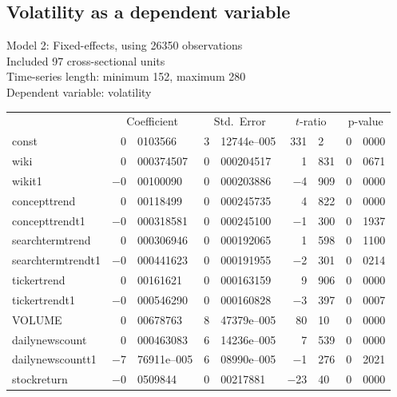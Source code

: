 \subsection{Volatility as a dependent variable}
\begin{center}

Model 2: Fixed-effects, using 26350 observations\\
Included 97 cross-sectional units\\
Time-series length: minimum 152, maximum 280\\
Dependent variable: volatility\\

\vspace{1em}

\begin{tabular}{lr@{,}lr@{,}lr@{,}lr@{,}l}
  &
 \multicolumn{2}{c}{Coefficient} &
  \multicolumn{2}{c}{Std.\ Error} &
   \multicolumn{2}{c}{$t$-ratio} &
    \multicolumn{2}{c}{p-value} \\[1ex]
const &
  0&0103566 &
    3&12744\textrm{e--005} &
      331&2 &
        0&0000 \\
wiki &
  0&000374507 &
    0&000204517 &
      1&831 &
        0&0671 \\
wikit1 &
  $-$0&00100090 &
    0&000203886 &
      $-$4&909 &
        0&0000 \\
concepttrend &
  0&00118499 &
    0&000245735 &
      4&822 &
        0&0000 \\
concepttrendt1 &
  $-$0&000318581 &
    0&000245100 &
      $-$1&300 &
        0&1937 \\
searchtermtrend &
  0&000306946 &
    0&000192065 &
      1&598 &
        0&1100 \\
searchtermtrendt1 &
  $-$0&000441623 &
    0&000191955 &
      $-$2&301 &
        0&0214 \\
tickertrend &
  0&00161621 &
    0&000163159 &
      9&906 &
        0&0000 \\
tickertrendt1 &
  $-$0&000546290 &
    0&000160828 &
      $-$3&397 &
        0&0007 \\
VOLUME &
  0&00678763 &
    8&47379\textrm{e--005} &
      80&10 &
        0&0000 \\
dailynewscount &
  0&000463083 &
    6&14236\textrm{e--005} &
      7&539 &
        0&0000 \\
dailynewscountt1 &
  $-$7&76911\textrm{e--005} &
    6&08990\textrm{e--005} &
      $-$1&276 &
        0&2021 \\
stockreturn &
  $-$0&0509844 &
    0&00217881 &
      $-$23&40 &
        0&0000 \\
\end{tabular}


\end{center}
